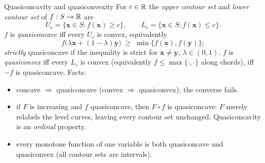 \begin{rulebox}{Quasiconcavity and quasiconvexity}
For $c\in\mathbb{R}$ the \emph{upper contour set} and
\emph{lower contour set} of $f:S\to\mathbb{R}$ are
\[
  U_c=\{\mathbf{x}\in S: f(\mathbf{x})\ge c\}, \qquad
  L_c=\{\mathbf{x}\in S: f(\mathbf{x})\le c\}.
\]
$f$ is \emph{quasiconcave} iff every $U_c$ is convex,
equivalently
\[
  f\bigl(\lambda\mathbf{x}+(1-\lambda)\mathbf{y}\bigr)
  \;\ge\; \min\{f(\mathbf{x}),f(\mathbf{y})\} ;
\]
\emph{strictly} quasiconcave if the inequality is strict for
$\mathbf{x}\neq\mathbf{y}$, $\lambda\in(0,1)$. $f$ is \emph{quasiconvex}
iff every $L_c$ is convex (equivalently $f\le\max\{\cdot,\cdot\}$ along
chords), iff $-f$ is quasiconcave. Facts:
\begin{itemize}[leftmargin=1.6em,itemsep=0.3ex]
  \item concave $\Rightarrow$ quasiconcave (convex $\Rightarrow$
        quasiconvex); the converse fails.
  \item if $F$ is increasing and $f$ quasiconcave, then $F\circ f$ is
        quasiconcave: $F$ merely relabels the level curves, leaving every
        contour set unchanged. Quasiconcavity is an \emph{ordinal}
        property.
  \item every monotone function of one variable is both quasiconcave and
        quasiconvex (all contour sets are intervals).
\end{itemize}
\end{rulebox}

